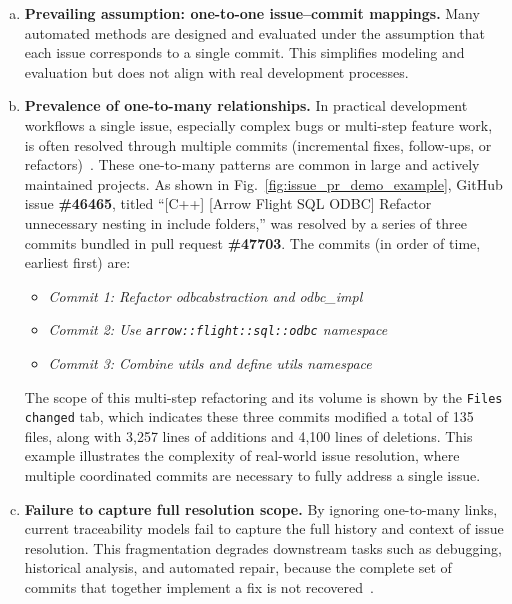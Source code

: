 \begin{enumerate}[a)]
	\item \textbf{Prevailing assumption: one-to-one issue--commit mappings.} Many automated methods are designed and evaluated under the assumption that each issue corresponds to a single commit. This simplifies modeling and evaluation but does not align with real development processes.
	
	\item \textbf{Prevalence of one-to-many relationships.} In practical development workflows a single issue, especially complex bugs or multi-step feature work, is often resolved through multiple commits (incremental fixes, follow-ups, or refactors)~\cite{r7,r17}. These one-to-many patterns are common in large and actively maintained projects. As shown in Fig.~\ref{fig:issue_pr_demo_example}, GitHub issue \textbf{\#46465}, titled ``[C++] [Arrow Flight SQL ODBC] Refactor unnecessary nesting in include folders,'' was resolved by a series of three commits bundled in pull request \textbf{\#47703}. The commits (in order of time, earliest first) are:
    \begin{itemize}
        \setlength\itemsep{0pt}
        \setlength\parskip{0pt}
        \setlength\topsep{0pt}
        \item \textit{Commit 1: Refactor odbcabstraction and odbc\_impl}
        \item \textit{Commit 2: Use \texttt{arrow::flight::sql::odbc} namespace}
        \item \textit{Commit 3: Combine utils and define utils namespace}
        \end{itemize}

    The scope of this multi-step refactoring and its volume is shown by the \texttt{Files changed} tab, which indicates these three commits modified a total of 135 files, along with 3,257 lines of additions and 4,100 lines of deletions. This example illustrates the complexity of real-world issue resolution, where multiple coordinated commits are necessary to fully address a single issue.

	\item \textbf{Failure to capture full resolution scope.} By ignoring one-to-many links, current traceability models fail to capture the full history and context of issue resolution. This fragmentation degrades downstream tasks such as debugging, historical analysis, and automated repair, because the complete set of commits that together implement a fix is not recovered~\cite{r7}.
\end{enumerate}


